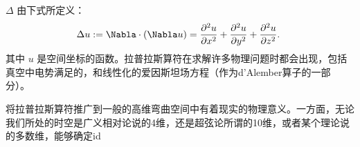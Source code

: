 
 $\Delta$ 由下式所定义：
\begin{equation}
\Delta u:=\Nabla\cdot (\Nabla u)=\frac{\partial^{2}{u}}{\partial{x}^{2}} + \frac{\partial^{2}{u}}{\partial{y}^{2}} + \frac{\partial^{2}{u}}{\partial{z}^{2}}.~
\end{equation}
其中 $u$ 是空间坐标的函数。拉普拉斯算符在求解许多物理问题时都会出现，包括真空中电势满足的，和线性化的爱因斯坦场方程（作为d'Alember算子的一部分）。

将拉普拉斯算符推广到一般的高维弯曲空间中有着现实的物理意义。一方面，无论我们所处的时空是广义相对论说的4维，还是超弦论所谓的10维，或者某个理论说的多数维，能够确定id







